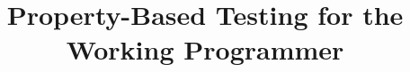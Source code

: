 \documentclass{NSF}
\begin{document}

\title{Property-Based Testing for the Working Programmer}



\newpage{}


\newpage{}
\renewcommand\refname{References Cited}



\newpage{}


\newpage{}


\newpage{}


\newpage{}


\newpage{}
\end{document}

